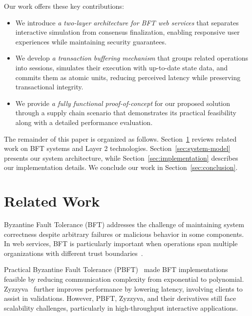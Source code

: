 \documentclass[conference]{IEEEtran}
\begin{document}
Our work offers these key contributions:
\begin{itemize}
    \item We introduce \textit{a two-layer architecture for BFT web services} that separates interactive simulation from consensus finalization, enabling responsive user experiences while maintaining security guarantees.
    
    \item We develop \textit{a transaction buffering mechanism} that groups related operations into sessions, simulates their execution with up-to-date state data, and commits them as atomic units, reducing perceived latency while preserving transactional integrity.
    
    \item We provide \textit{a fully functional proof-of-concept} for our proposed solution through a supply chain scenario that demonstrates its practical feasibility along with a detailed performance evaluation.
\end{itemize}

The remainder of this paper is organized as follows. Section~\ref{sec:related-work} reviews related work on BFT systems and Layer 2 technologies. Section~\ref{sec:system-model} presents our system architecture, while Section~\ref{sec:implementation} describes our implementation details. We conclude our work in Section~\ref{sec:conclusion}.

\section{Related Work}
\label{sec:related-work}

Byzantine Fault Tolerance (BFT) addresses the challenge of maintaining system correctness despite arbitrary failures or malicious behavior in some components. In web services, BFT is particularly important when operations span multiple organizations with different trust boundaries~\cite{lamport_byzantine_1982}.

Practical Byzantine Fault Tolerance (PBFT)~\cite{castro_practical_2002} made BFT implementations feasible by reducing communication complexity from exponential to polynomial. Zyzzyva~\cite{kotla_zyzzyva_2008} further improves performance by lowering latency, involving clients to assist in validations. However, PBFT, Zyzzyva, and their derivatives still face scalability challenges, particularly in high-throughput interactive applications.
\end{document}
